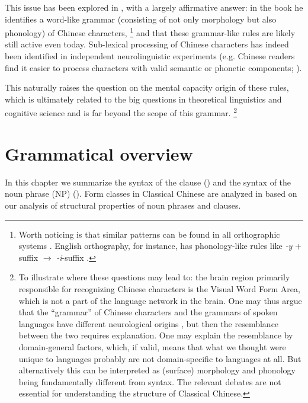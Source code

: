 \documentclass[UTF8, a4paper, oneside, scheme=plain, 12pt]{ctexrep}
\newcommand*{\textto}{$\to$}
\newcommand*{\citesec}[1]{\S~{#1}}
\newcommand*{\citepage}[1]{p.~{#1}}
\newcommand*{\citepages}[1]{pp.~{#1}}
\newcommand{\form}[1]{\emph{#1}}
\begin{document}
This issue has been explored in \citet{myers2019grammar},
with a largely affirmative answer:
in the book he identifies a word-like grammar (consisting of not only morphology but also phonology) of Chinese characters,%
\footnote{
    Worth noticing is that similar patterns can be found in all orthographic systems \citep[\citepages{23-25}]{myers2019grammar}.
    English orthography, for instance, has phonology-like rules like \form{-y} + suffix \textto{}  \form{-i}-suffix \citep[\citepage{26}]{myers2019grammar}.
}
and that these grammar-like rules are likely still active even today.
Sub-lexical processing of Chinese characters has indeed been identified in independent neurolinguistic experiments (e.g. Chinese readers find it easier to process characters with valid semantic or phonetic components; \citealt[\citesec{2.2}]{duan2024chinese}).

This naturally raises the question on the mental capacity origin of these rules,
which is ultimately related to the big questions in theoretical linguistics and cognitive science and is far beyond the scope of this grammar.%
\footnote{
    To illustrate where these questions may lead to: the brain region primarily responsible for recognizing Chinese characters
    is the Visual Word Form Area, which is not a part of the language network in the brain.
    One may thus argue that the ``grammar'' of Chinese characters and the grammars of spoken languages have different neurological origins \citep[\citepages{209-210}]{myers2019grammar},
    but then the resemblance between the two requires explanation.
    One may explain the resemblance by domain-general factors,
    which, if valid, means that 
    what we thought were unique to languages probably are not domain-specific to languages at all.
    But alternatively this can be interpreted as (surface) morphology and phonology being fundamentally different from syntax.
    The relevant debates are not essential for understanding the structure of Classical Chinese.
}


\chapter{Grammatical overview}\label{chap:grammatical}


In this chapter we summarize the syntax of the clause () and the syntax of the noun phrase (NP) (). 
Form classes in Classical Chinese are analyzed in  based on our analysis of structural properties of noun phrases and clauses.
\end{document}
